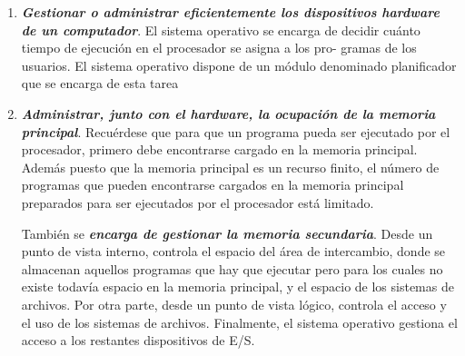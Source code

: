 \documentclass[12pt]{article}
\begin{document}
\begin{enumerate}
\item \textbf{\textit{Gestionar o administrar eficientemente los dispositivos hardware de un computador}}. El sistema
operativo se encarga de decidir cuánto tiempo de ejecución en el procesador se asigna a los pro-
gramas de los usuarios. El sistema operativo dispone de un módulo denominado planificador que
se encarga de esta tarea
\item \textbf{\textit{Administrar, junto con el hardware, la ocupación de la memoria principal}}. Recuérdese que para que un programa pueda ser ejecutado por el procesador, primero debe encontrarse cargado en la memoria principal. Además puesto que la memoria principal es un recurso finito, el número de programas que pueden encontrarse cargados en la memoria principal preparados para ser ejecutados por el procesador está limitado.

También se \textbf{\textit{encarga de gestionar la memoria secundaria}}. Desde un punto de
vista interno, controla el espacio del área de intercambio, donde se almacenan aquellos programas
que hay que ejecutar pero para los cuales no existe todavía espacio en la memoria principal, y
el espacio de los sistemas de archivos. Por otra parte, desde un punto de vista lógico, controla el
acceso y el uso de los sistemas de archivos. Finalmente, el sistema operativo gestiona el acceso a
los restantes dispositivos de E/S.


\end{enumerate}
\end{document}
